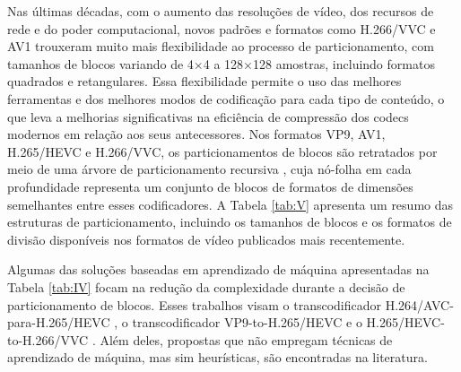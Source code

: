Nas últimas décadas, com o aumento das resoluções de vídeo, dos recursos de rede e do poder computacional, novos padrões e formatos como H.266/VVC e AV1 trouxeram muito mais flexibilidade ao processo de particionamento, com tamanhos de blocos variando de 4$\times$4 a 128$\times$128 amostras, incluindo formatos quadrados e retangulares. Essa flexibilidade permite o uso das melhores ferramentas e dos melhores modos de codificação para cada tipo de conteúdo, o que leva a melhorias significativas na eficiência de compressão dos codecs modernos em relação aos seus antecessores. Nos formatos VP9, AV1, H.265/HEVC e H.266/VVC, os particionamentos de blocos são retratados por meio de uma árvore de particionamento recursiva \cite{bib:av1_overview_2021, bib:hevc, bib:vvc_partitioningStructure}, cuja nó-folha em cada profundidade representa um conjunto de blocos de formatos de dimensões semelhantes entre esses codificadores. A Tabela \ref{tab:V} apresenta um resumo das estruturas de particionamento, incluindo os tamanhos de blocos e os formatos de divisão disponíveis nos formatos de vídeo publicados mais recentemente.



Algumas das soluções baseadas em aprendizado de máquina apresentadas na Tabela \ref{tab:IV} focam na redução da complexidade durante a decisão de particionamento de blocos. Esses trabalhos visam o transcodificador H.264/AVC-para-H.265/HEVC \cite{bib:holder_2009, bib:peixoto2_2014, bib:honrubia_2014, bib:peixoto3_2014, bib:huangyuan_2015, bib:honrubia_2015, bib:honrubia_2016, bib:correa_2016, bib:liu_2018, bib:xu_2019, bib:soares_2019}, o transcodificador VP9-to-H.265/HEVC \cite{bib:li_2017} e o H.265/HEVC-to-H.266/VVC \cite{bib:lucas_2020}. Além deles, propostas que não empregam técnicas de aprendizado de máquina, mas sim heurísticas, são encontradas na literatura. 

